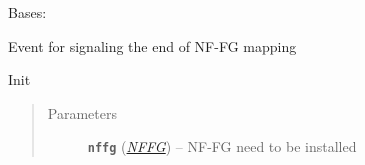 \documentclass[letterpaper,10pt,english]{sphinxmanual}
\begin{document}

\begin{fulllineitems}
\label{orchest/ros_mapping:escape.orchest.ros_mapping.NFFGMappingFinishedEvent}
Bases: 

Event for signaling the end of NF-FG mapping

\begin{fulllineitems}
\label{orchest/ros_mapping:escape.orchest.ros_mapping.NFFGMappingFinishedEvent.__init__}
Init
\begin{quote}\begin{description}
\item[{Parameters}] \leavevmode
\textbf{\texttt{nffg}} ({\hyperref[util/nffg:escape.util.nffg.NFFG]{\emph{\emph{NFFG}}}}) -- NF-FG need to be installed

\end{description}\end{quote}

\end{fulllineitems}


\end{fulllineitems}

\end{document}
